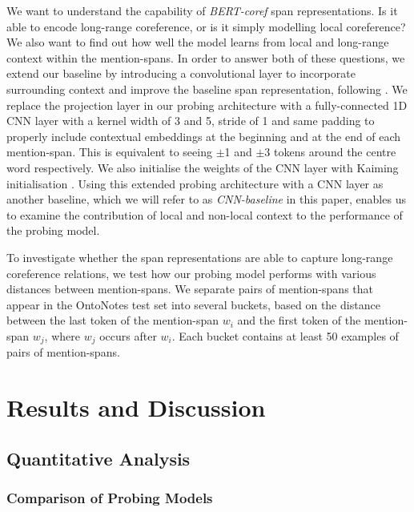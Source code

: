 \documentclass[11pt]{article}
\begin{document}
We want to understand the capability of \textit{BERT-coref} span representations. Is it able to encode long-range coreference, or is it simply modelling local coreference? We also want to find out how well the model learns from local and long-range context within the mention-spans. In order to answer both of these questions, we extend our baseline by introducing a convolutional layer to incorporate surrounding context and improve the baseline span representation, following \textcite{tenney2019context}. We replace the projection layer in our probing architecture with a fully-connected 1D CNN layer with a kernel width of 3 and 5, stride of 1 and same padding to properly include contextual embeddings at the beginning and at the end of each mention-span. This is equivalent to seeing $\pm$1 and $\pm$3 tokens around the centre word respectively. We also initialise the weights of the CNN layer with Kaiming initialisation \parencite{kaiming}. Using this extended probing architecture with a CNN layer as another baseline, which we will refer to as \textit{CNN-baseline} in this paper, enables us to examine the contribution of local and non-local context to the performance of the probing model. 

To investigate whether the span representations are able to capture long-range coreference relations, we test how our probing model performs with various distances between mention-spans. We separate pairs of mention-spans that appear in the OntoNotes test set into several buckets, based on the distance between the last token of the mention-span $w_{i}$ and the first token of the  mention-span $w_{j}$, where $w_{j}$ occurs after $w_{i}$. Each bucket contains at least 50 examples of pairs of mention-spans. 




\section{Results and Discussion}
\subsection{Quantitative Analysis}
\subsubsection{Comparison of Probing Models}
\end{document}
